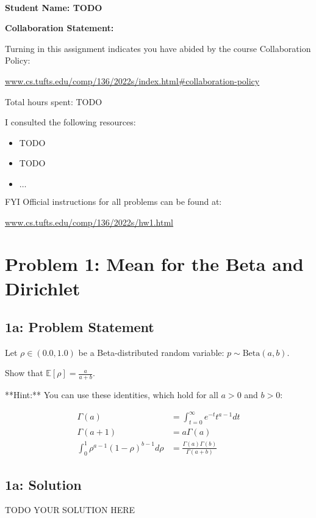 \documentclass[12pt]{article}
\newcommand{\officialdirections}[1]{{\color{blue} #1}}
\begin{document}
~~\\ %

{\Large{\bf Student Name: TODO}}

{\Large{\bf Collaboration Statement:}}

Turning in this assignment indicates you have abided by the course Collaboration Policy:

\url{www.cs.tufts.edu/comp/136/2022s/index.html#collaboration-policy}

Total hours spent: TODO

I consulted the following resources:
\begin{itemize}
\item TODO
\item TODO
\item $\ldots$	
\end{itemize}

FYI Official instructions for all problems can be found at:

\url{www.cs.tufts.edu/comp/136/2022s/hw1.html}

\tableofcontents

\newpage
\section*{Problem 1: Mean for the Beta and Dirichlet}

\officialdirections{
\subsection*{1a: Problem Statement}

Let $\rho \in (0.0, 1.0)$ be a Beta-distributed random variable: $p \sim \text{Beta}(a, b)$. 

Show that $\mathbb{E}[ \rho ] = \frac{a}{a + b}$.

**Hint:** You can use these identities, which hold for all $a > 0$ and $b > 0$:

\begin{align}
\Gamma(a) &= \int_{t=0}^{\infty} e^{-t} t^{a-1} dt
\\
\Gamma(a+1) &= a \Gamma(a)
\\
\int_{0}^1 \rho^{a-1} (1-\rho)^{b-1} d\rho &= \frac{\Gamma(a)\Gamma(b)}{\Gamma(a+b)}
\end{align}
}

\subsection{1a: Solution}
TODO YOUR SOLUTION HERE
\end{document}
